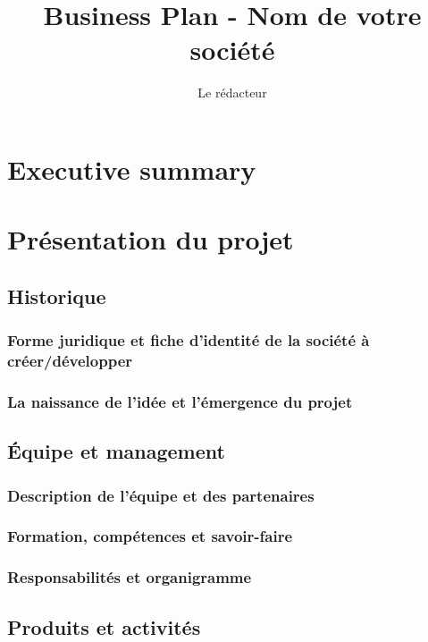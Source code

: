 \documentclass[a4paper]{report}
\title{Business Plan - Nom de votre société}
\author{Le rédacteur}
\begin{document}
\maketitle

\chapter{Executive summary}

\chapter{Présentation du projet}

\section{Historique}

\subsection{Forme juridique et fiche d’identité de la société à
créer/développer}

\subsection{La naissance de l’idée et l’émergence du projet}

\section{Équipe et management}

\subsection{Description de l'équipe et des partenaires}

\subsection{Formation, compétences et savoir-faire}

\subsection{Responsabilités et organigramme}

\section{Produits et activités}
\end{document}

